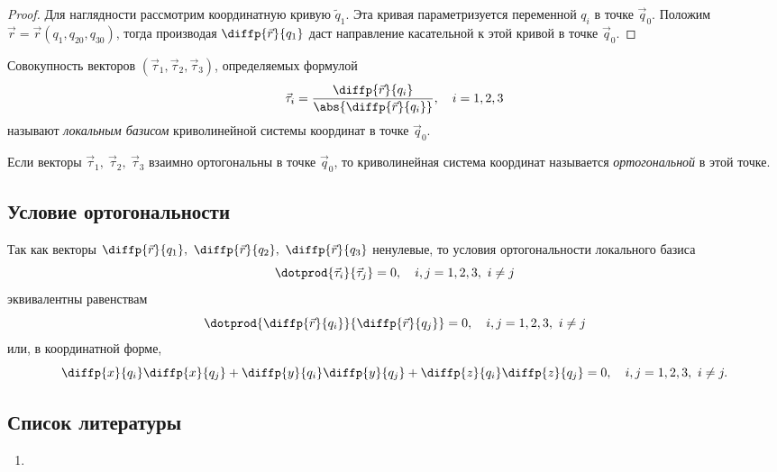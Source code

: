 \begin{proof}
  Для наглядности рассмотрим координатную кривую $\tilde{q}_1$. Эта кривая
  параметризуется переменной $q_i$ в точке $\vec{q}_0$. Положим
  $\vec{r} = \vec{r}(q_1, q_{20}, q_{30})$, тогда производая
  $\diffp{\vec{r}}{{q_1}}$ даст направление касательной к этой кривой в точке
  $\vec{q}_0$.
\end{proof}

\begin{definition}
  Совокупность векторов $(\vec{\tau}_1, \vec{\tau}_2, \vec{\tau}_3)$,
  определяемых формулой
  \begin{equation*}
    \vec{\tau}_i = \frac{\diffp{\vec{r}}{{q_i}}}{\abs{\diffp{\vec{r}}{{q_i}}}},
      \quad i = 1,2,3
  \end{equation*}
  называют \textit{локальным базисом} криволинейной системы координат в точке
  $\vec{q}_0$.
\end{definition}

\begin{definition}
  Если векторы $\vec{\tau}_1,~\vec{\tau}_2,~\vec{\tau}_3$ взаимно ортогональны
  в точке $\vec{q}_0$, то криволинейная система координат называется
  \textit{ортогональной} в этой точке.
\end{definition}

\subsection{Условие ортогональности}

Так как векторы $\diffp{\vec{r}}{{q_1}},~\diffp{\vec{r}}{{q_2}},
~\diffp{\vec{r}}{{q_3}}$ ненулевые, то условия ортогональности локального базиса
\begin{equation*}
  \dotprod{\vec{\tau}_i}{\vec{\tau}_j} = 0, \quad i,j = 1,2,3,~i \neq j
\end{equation*}
эквивалентны равенствам
\begin{equation*}
  \dotprod{\diffp{\vec{r}}{{q_i}}}{\diffp{\vec{r}}{{q_j}}} = 0,
    \quad i,j = 1,2,3,~i \neq j
\end{equation*}
или, в координатной форме,
\begin{equation}
  \diffp{x}{{q_i}} \diffp{x}{{q_j}} + \diffp{y}{{q_i}} \diffp{y}{{q_j}} +
    \diffp{z}{{q_i}} \diffp{z}{{q_j}} = 0, \quad i,j = 1,2,3,~i \neq j.
\end{equation}

\subsection{Список литературы}
\begin{enumerate}
  \item \cite{lectures}
\end{enumerate}


